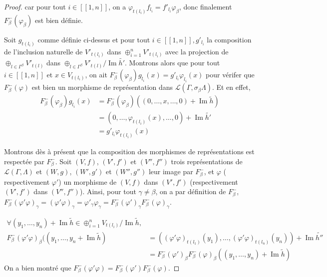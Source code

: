 \documentclass[a4paper,10pt]{article}
\DeclareMathOperator{\Img}{Im}
\begin{document}
\begin{proof}
 car pour tout $i \in [\![1,n]\!]$, on a $\varphi_{t(l_{i})}  f_{l_{i}} = f'_{l_{i}}  \varphi_{\beta} $, donc finalement $F_{\beta}^{-}(\varphi_{\beta})$ est bien définie.


Soit $g_{t(l_{i})}$ comme définie ci-dessus et  pour tout  $i\in[\![1,n]\!],g'_{l_{i}}$ la composition de l'inclusion naturelle de $V'_{t(l_{i})}$ dans $\oplus_{i = 1}^{n} V'_{t(l_{i})}$ avec la projection de $\oplus_{l \in \Gamma^{\beta}} V'_{t(l)}$ dans $\oplus_{l \in \Gamma^{\beta}} V'_{t(l)} / \Img \tilde{h'}$. Montrons alors que pour tout $i \in [\![1,n]\!]$ et $x \in V_{t(l_{i})}$, on ait $F^{-}_{\beta}(\varphi_{\beta})  g_{l_{i}}(x)  = g'_{l_{i}}  \varphi_{l_{i}}(x)$ pour vérifer que $F_{\beta}^{-}(\varphi)$ est bien un morphisme de représentation dans $\mathscr L(\Gamma,\sigma_{\beta}\Lambda)$. Et en effet, 
\[
\begin{array}{ll}
  F^{-}_{\beta}(\varphi_{\beta})  g_{l_{i}}(x) &= F^{-}_{\beta}(\varphi_{\beta})((0, \dots, x, \dots, 0) + \Img \tilde{h}) \\
                                                    &= (0, \dots, \varphi_{t(l_{i})}(x),\dots,0) +\Img \tilde{h'} \\
                                                    &= g'_{l_{i}}  \varphi_{t(l_{i})}(x)
\end{array}
\] 

Montrons dès à présent que la composition des morphismes de représentations est respectée par $F^{-}_{\beta}$. Soit $(V,f)$, $(V',f')$ et $(V'',f'')$ trois représentations de $\mathscr L(\Gamma,\Lambda)$ et $(W,g)$, $(W',g')$ et $(W'',g'')$ leur image par $F^{-}_{\beta}$, et $\varphi$ ( respectivement $\varphi'$) un morphisme de $(V,f)$ dans $(V',f')$ (respectivement $(V',f')$ dans $(V'',f'')$). Ainsi, pour tout $\gamma \neq \beta$, on a par définition de $F^{-}_{\beta}$, $F^{-}_{\beta}(\varphi' \varphi)_{\gamma} = (\varphi' \varphi)_{\gamma} = \varphi'_{\gamma} \varphi_{\gamma} = F^{-}_{\beta}(\varphi')_{\gamma}  F^{-}_{\beta}(\varphi)_{\gamma}$.

\[
\begin{array}{rl}
  \forall (y_{1}, \dots, y_{n}) + \Img \tilde{h} \in \oplus_{i=1}^{n} V_{t(l_{i})} / \Img \tilde{h},& \\
  F^{-}_{\beta}(\varphi' \varphi)_{\beta}((y_{1}, \dots, y_{n} + \Img \tilde{h}) &= ((\varphi' \varphi)_{t(l_{1})}(y_{1}), \dots, (\varphi' \varphi)_{t(l_{n})}(y_{n})) + \Img \tilde{h''} \\
                                                                                                    &= F^{-}_{\beta}(\varphi')_{\beta} F^{-}_{\beta}(\varphi)_{\beta}((y_{1}, \dots, y_{n}) + \Img \tilde{h})
\end{array}
\]
 On a bien montré que $F^{-}_{\beta}(\varphi' \varphi) = F^{-}_{\beta}(\varphi') F^{-}_{\beta}(\varphi)$.


\end{proof}
\end{document}
